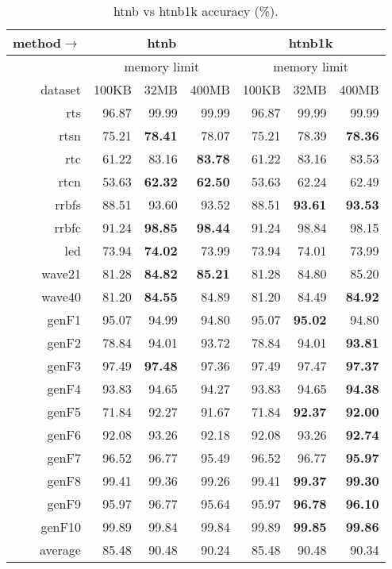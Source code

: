 \begin{table}
\caption{{\sc htnb} vs {\sc htnb1k} accuracy (\%).}
\label{tab:htnb_vs_htnb1k_acc}
\centering
\begin{tabular}{|r||r|r|r||r|r|r|}
\hline
method$\rightarrow$ & \multicolumn{3}{|c||}{{\sc htnb}} & \multicolumn{3}{|c|}{{\sc htnb1k}} \\
\hline
 & \multicolumn{3}{|c||}{memory limit} & \multicolumn{3}{|c|}{memory limit} \\
\hline
dataset & 100KB & 32MB & 400MB & 100KB & 32MB & 400MB \\
\hline
{\sc rts} & 96.87 & 99.99 & 99.99 & 96.87 & 99.99 & 99.99 \\
{\sc rtsn} & 75.21 & \textbf{78.41} & 78.07 & 75.21 & 78.39 & \textbf{78.36} \\
{\sc rtc} & 61.22 & 83.16 & \textbf{83.78} & 61.22 & 83.16 & 83.53 \\
{\sc rtcn} & 53.63 & \textbf{62.32} & \textbf{62.50} & 53.63 & 62.24 & 62.49 \\
{\sc rrbfs} & 88.51 & 93.60 & 93.52 & 88.51 & \textbf{93.61} & \textbf{93.53} \\
{\sc rrbfc} & 91.24 & \textbf{98.85} & \textbf{98.44} & 91.24 & 98.84 & 98.15 \\
{\sc led} & 73.94 & \textbf{74.02} & 73.99 & 73.94 & 74.01 & 73.99 \\
{\sc wave21} & 81.28 & \textbf{84.82} & \textbf{85.21} & 81.28 & 84.80 & 85.20 \\
{\sc wave40} & 81.20 & \textbf{84.55} & 84.89 & 81.20 & 84.49 & \textbf{84.92} \\
{\sc genF1} & 95.07 & 94.99 & 94.80 & 95.07 & \textbf{95.02} & 94.80 \\
{\sc genF2} & 78.84 & 94.01 & 93.72 & 78.84 & 94.01 & \textbf{93.81} \\
{\sc genF3} & 97.49 & \textbf{97.48} & 97.36 & 97.49 & 97.47 & \textbf{97.37} \\
{\sc genF4} & 93.83 & 94.65 & 94.27 & 93.83 & 94.65 & \textbf{94.38} \\
{\sc genF5} & 71.84 & 92.27 & 91.67 & 71.84 & \textbf{92.37} & \textbf{92.00} \\
{\sc genF6} & 92.08 & 93.26 & 92.18 & 92.08 & 93.26 & \textbf{92.74} \\
{\sc genF7} & 96.52 & 96.77 & 95.49 & 96.52 & 96.77 & \textbf{95.97} \\
{\sc genF8} & 99.41 & 99.36 & 99.26 & 99.41 & \textbf{99.37} & \textbf{99.30} \\
{\sc genF9} & 95.97 & 96.77 & 95.64 & 95.97 & \textbf{96.78} & \textbf{96.10} \\
{\sc genF10} & 99.89 & 99.84 & 99.84 & 99.89 & \textbf{99.85} & \textbf{99.86} \\
\hline
average & 85.48 & 90.48 & 90.24 & 85.48 & 90.48 & 90.34 \\
\hline
\end{tabular}
\end{table}

